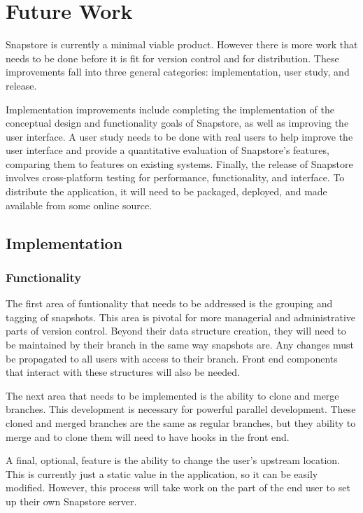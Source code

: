 \chapter{Future Work}

Snapstore is currently a minimal viable product. However there is more work that needs to be done before it is fit for version control and for distribution. These improvements fall into three general categories: implementation, user study, and release. 

Implementation improvements include completing the implementation of the conceptual design and functionality goals of Snapstore, as well as improving the user interface. A user study needs to be done with real users to help improve the user interface and provide a quantitative evaluation of Snapstore's features, comparing them to features on existing systems. Finally, the release of Snapstore involves cross-platform testing for performance, functionality, and interface. To distribute the application, it will need to be packaged, deployed, and made available from some online source.

\section{Implementation}

\subsection{Functionality}

The first area of funtionality that needs to be addressed is the grouping and tagging of snapshots. This area is pivotal for more managerial and administrative parts of version control. Beyond their data structure creation, they will need to be maintained by their branch in the same way snapshots are. Any changes must be propagated to all users with access to their branch. Front end components that interact with these structures will also be needed.

The next area that needs to be implemented is the ability to clone and merge branches. This development is necessary for powerful parallel development. These cloned and merged branches are the same as regular branches, but they ability to merge and to clone them will need to have hooks in the front end.

A final, optional, feature is the ability to change the user's upstream location. This is currently just a static value in the application, so it can be easily modified. However, this process will take work on the part of the end user to set up their own Snapstore server.

